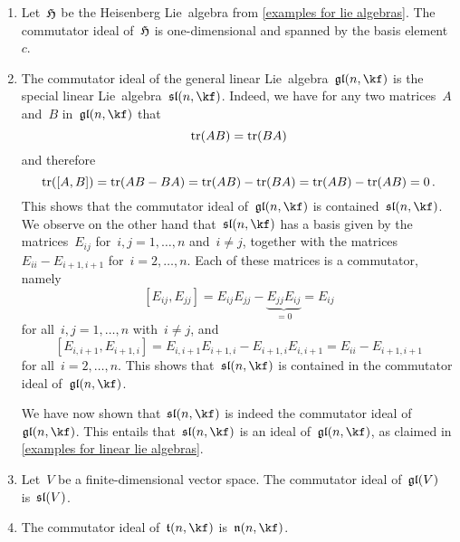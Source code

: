 \begin{example}
	\label{examples of commutator ideals}
	\leavevmode
	\begin{enumerate}
		\item
			Let~$\mathfrak{H}$ be the Heisenberg Lie~algebra from \cref{examples for lie algebras}.
			The commutator ideal of~$\mathfrak{H}$ is one-dimensional and spanned by the basis element~$c$.
		\item
			The commutator ideal of the general linear Lie~algebra~$\gllie(n, \kf)$ is the special linear Lie~algebra~$\sllie(n, \kf)$.
			Indeed, we have for any two matrices~$A$ and~$B$ in~$\gllie(n, \kf)$ that
			\[
				\operatorname{tr}(AB) = \operatorname{tr}(BA)
			\]
			and therefore
			\[
					\operatorname{tr}( [A,B] )
				= \operatorname{tr}(AB-BA)
				= \operatorname{tr}(AB) - \operatorname{tr}(BA)
				= \operatorname{tr}(AB) - \operatorname{tr}(AB)
				= 0  \,.
			\]
			This shows that the commutator ideal of~$\gllie(n, \kf)$ is contained~$\sllie(n, \kf)$.
			We observe on the other hand that~$\sllie(n, \kf)$ has a basis given by the matrices~$E_{ij}$ for~$i,j = 1, \dotsc, n$ and~$i \neq j$, together with the matrices~$E_{ii} - E_{i+1,i+1}$ for~$i = 2, \dotsc, n$.
			Each of these matrices is a commutator, namely
			\[
				[E_{ij}, E_{jj}]
				=
				E_{ij} E_{jj} - \underbrace{ E_{jj} E_{ij} }_{=0}
				=
				E_{ij}
			\]
			for all~$i, j = 1, \dotsc, n$ with~$i \neq j$, and
			\[
				[E_{i,i+1}, E_{i+1,i}]
				=
				E_{i,i+1} E_{i+1,i} - E_{i+1,i} E_{i,i+1}
				=
				E_{ii} - E_{i+1,i+1}
			\]
			for all~$i = 2, \dotsc, n$.
			This shows that~$\sllie(n, \kf)$ is contained in the commutator ideal of~$\gllie(n, \kf)$.

			We have now shown that~$\sllie(n, \kf)$ is indeed the commutator ideal of~$\gllie(n, \kf)$.
			This entails that~$\sllie(n, \kf)$ is an ideal of~$\gllie(n, \kf)$, as claimed in \cref{examples for linear lie algebras}.
		\item
			Let~$V$ be a finite-dimensional vector space.
			The commutator ideal of~$\mathfrak{gl}(V)$ is~$\mathfrak{sl}(V)$.
		\item
			The commutator ideal of~$\trianglie(n, \kf)$ is~$\upperlie(n, \kf)$.
		

\end{enumerate}
\end{example}
